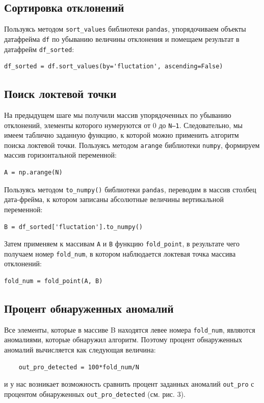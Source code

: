 \documentclass[a4paper,12pt]{article}
\begin{document}
\subsection{Сортировка отклонений}


Пользуясь методом \texttt{sort\_values} библиотеки \texttt{pandas}, упорядочиваем объекты датафрейма \texttt{df} по убыванию величины отклонения и помещаем результат в датафрейм \texttt{df\_sorted}:
\begin{verbatim}
df_sorted = df.sort_values(by='fluctation', ascending=False)
\end{verbatim}


\subsection{Поиск локтевой точки}

На предыдущем шаге мы получили массив упорядоченных по убыванию отклонений, элементы которого нумеруются от 0 до \texttt{N–1}. Следовательно, мы имеем таблично заданную функцию, к которой можно применить алгоритм поиска локтевой точки. Пользуясь методом \texttt{arange} библиотеки \texttt{numpy}, формируем массив горизонтальной переменной:
\begin{verbatim}
A = np.arange(N)
\end{verbatim}
Пользуясь методом \texttt{to\_numpy()} библиотеки \texttt{pandas}, переводим в массив столбец дата-фрейма, к котором записаны абсолютные величины вертикальной переменной:
\begin{verbatim}
B = df_sorted['fluctation'].to_numpy()
\end{verbatim}
Затем применяем к массивам \texttt{A} и \texttt{B} функцию \texttt{fold\_point}, в результате чего получаем номер \texttt{fold\_num}, в котором наблюдается локтевая точка массива отклонений:
\begin{verbatim}
fold_num = fold_point(A, B)
\end{verbatim}


\subsection{Процент обнаруженных аномалий}

Все элементы, которые в массиве B находятся левее номера \texttt{fold\_num}, являются аномалиями, которые обнаружил алгоритм. Поэтому процент обнаруженных аномалий вычисляется как следующая величина:
\begin{verbatim}
	out_pro_detected = 100*fold_num/N
\end{verbatim}
и у нас возникает возможность сравнить процент заданных аномалий \texttt{out\_pro} с процентом обнаруженных \texttt{out\_pro\_detected} (см. рис. 3).
\end{document}
